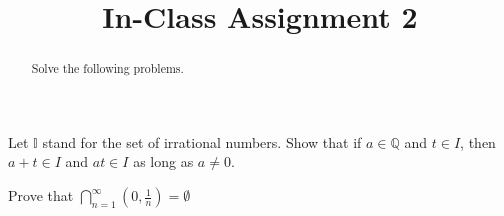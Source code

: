 \documentclass{ximera}
\begin{document}
    \title{In-Class Assignment 2}
    \begin{abstract} Solve the following problems. \end{abstract}
    \maketitle

    \begin{exercise}
        Let $\mathbb{I}$ stand for the set of irrational numbers.  Show that if $a \in \mathbb{Q}$ and $t \in I$, then $a+t \in I$ and $at \in I$ as long as $a \neq 0$.
     \end{exercise}
     \newpage

     \begin{exercise}
         Prove that $\bigcap\limits_{n=1}^\infty \left(0,\frac1n\right) = \emptyset$
     \end{exercise}
\end{document}
